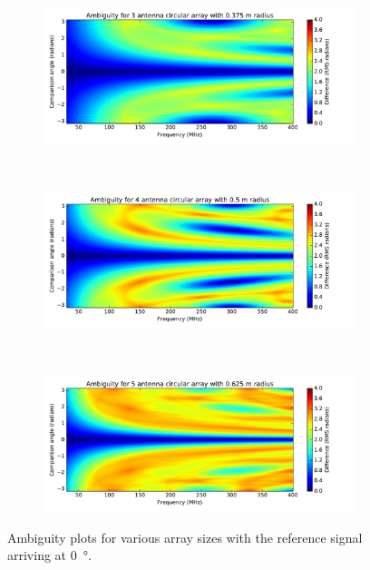 \begin{figure}[H]
  \centering
  \begin{subfigure}{0.95\textwidth}
    \centering
    \includegraphics[width=\textwidth, clip=true, trim = 10 15 53 0]{ambiguity03}
  \end{subfigure}\\[1em]
  \begin{subfigure}{\textwidth}
    \centering
    \includegraphics[width=\textwidth, clip=true, trim = 10 15 53 0]{ambiguity04}
  \end{subfigure}\\[1em]
  \begin{subfigure}{\textwidth}
    \centering
    \includegraphics[width=\textwidth, clip=true, trim = 10 15 53 0]{ambiguity05}
  \end{subfigure}
  \caption{Ambiguity plots for various array sizes with the reference signal arriving at \SI{0}{\degree}.}
  \label{fig:system-design-phase-ambiguity-simulations}
\end{figure}
